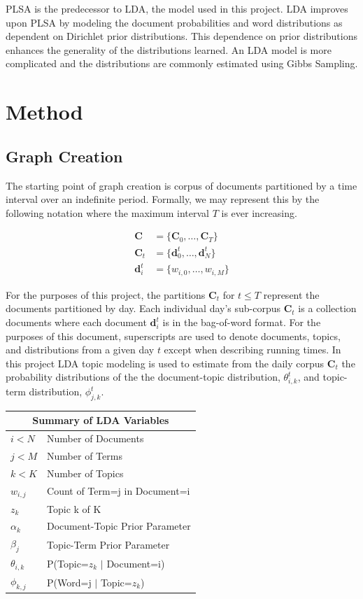 \documentclass[10pt,twocolumn]{article}
\begin{document}
PLSA is the predecessor to LDA, the model used in this project.  LDA improves upon PLSA by modeling the document probabilities and word distributions as dependent on Dirichlet prior distributions.  This dependence on prior distributions enhances the generality of the distributions learned.  An LDA model is more complicated and the distributions are commonly estimated using Gibbs Sampling.

\section {Method}
\subsection {Graph Creation}
The starting point of graph creation is corpus of documents partitioned by a time interval over an indefinite period.   Formally, we may represent this by the following notation where the maximum interval $T$ is ever increasing.  

\begin{align*}
\mathbf{C} &= \{ \mathbf{C}_0, \dots, \mathbf{C}_T \} \\
\mathbf{C}_t &= \{\mathbf{d}_0^t, \dots, \mathbf{d}_N^t \} \\
\mathbf{d}_i^t &= \{ w_{i,0}, \dots, w_{i,M} \}
\end{align*}

For the purposes of this project, the partitions $\mathbf{C}_t$ for $t \le T$ represent the documents partitioned by day.  Each individual day's sub-corpus $\mathbf{C}_t$ is a collection documents where each document $\mathbf{d}_i^t$ is in the bag-of-word format.  For the purposes of this document, superscripts are used to denote documents, topics, and distributions from a given day $t$ except when describing running times.  In this project LDA topic modeling is used to estimate from the daily corpus $\mathbf{C}_t$ the probability distributions of the the document-topic distribution, $\theta_{i,k}^t$, and topic-term distribution, $\phi_{j,k}^t$.

\begin{center}
\begin{tabular}{|l|l|}
  \hline
  \multicolumn{2}{|c|}{Summary of LDA Variables} \\
  \hline
  $i < N$ & Number of Documents \\
  $j < M$ & Number of Terms \\
  $k < K$ & Number of Topics \\
  $w_{i, j}$ & Count of Term=j in Document=i \\
  $z_k$ & Topic k of K \\
  \emph{$\alpha_k$} & Document-Topic Prior Parameter\\
  \emph{$\beta_j$} & Topic-Term Prior Parameter \\
  $\theta_{i,k}$ & P(Topic=$z_k$ $\vert$ Document=i) \\
  $\phi_{k,j}$ & P(Word=j $\vert$ Topic=$z_k$) \\
  \hline
\end{tabular}
\end{center} 
\end{document}
